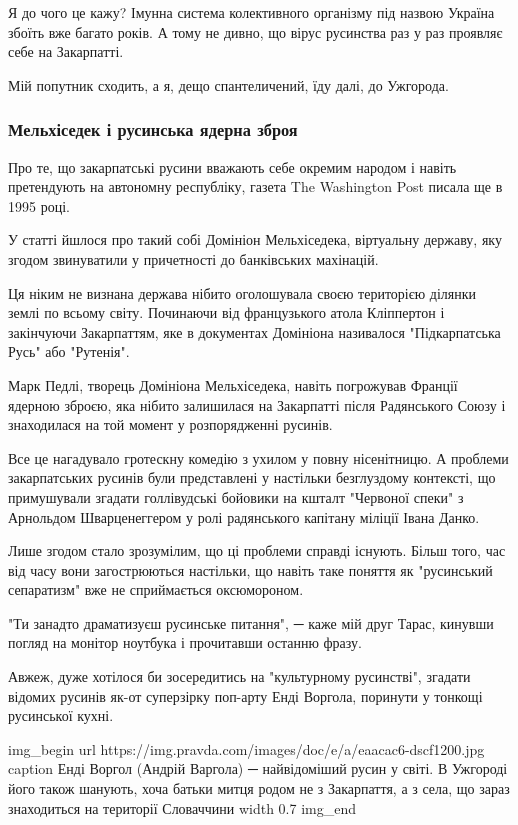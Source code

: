 Я до чого це кажу? Імунна система колективного організму під назвою Україна
збоїть вже багато років. А тому не дивно, що вірус русинства раз у раз проявляє
себе на Закарпатті.

Мій попутник сходить, а я, дещо спантеличений, їду далі, до Ужгорода.

\subsubsection{Мельхіседек і русинська ядерна зброя}

Про те, що закарпатські русини вважають себе окремим народом і навіть
претендують на автономну республіку, газета The Washington Post писала ще в
1995 році.

У статті йшлося про такий собі Домініон Мельхіседека, віртуальну державу, яку
згодом звинуватили у причетності до банківських махінацій.

Ця ніким не визнана держава нібито оголошувала своєю територією ділянки землі
по всьому світу. Починаючи від французького атола Кліппертон і закінчуючи
Закарпаттям, яке в документах Домініона називалося "Підкарпатська Русь" або
"Рутенія".

Марк Педлі, творець Домініона Мельхіседека, навіть погрожував Франції ядерною
зброєю, яка нібито залишилася на Закарпатті після Радянського Союзу і
знаходилася на той момент у розпорядженні русинів.

Все це нагадувало гротескну комедію з ухилом у повну нісенітницю. А проблеми
закарпатських русинів були представлені у настільки безглуздому контексті, що
примушували згадати голлівудські бойовики на кшталт "Червоної спеки" з
Арнольдом Шварценеггером у ролі радянського капітану міліції Івана Данко. 

Лише згодом стало зрозумілим, що ці проблеми справді існують. Більш того, час
від часу вони загострюються настільки, що навіть таке поняття як "русинський
сепаратизм" вже не сприймається оксюмороном.

"Ти занадто драматизуєш русинське питання", ─ каже мій друг Тарас, кинувши
погляд на монітор ноутбука і прочитавши останню фразу.

Авжеж, дуже хотілося би зосередитись на "культурному русинстві", згадати
відомих русинів як-от суперзірку поп-арту Енді Воргола, поринути у тонкощі
русинської кухні.

\ifcmt
img_begin 
    url https://img.pravda.com/images/doc/e/a/eaacac6-dscf1200.jpg
    caption Енді Воргол (Андрій Варгола) ─ найвідоміший русин у світі. В Ужгороді його також шанують, хоча батьки митця родом не з Закарпаття, а з села, що зараз знаходиться на території Словаччини
    width 0.7
img_end
\fi

